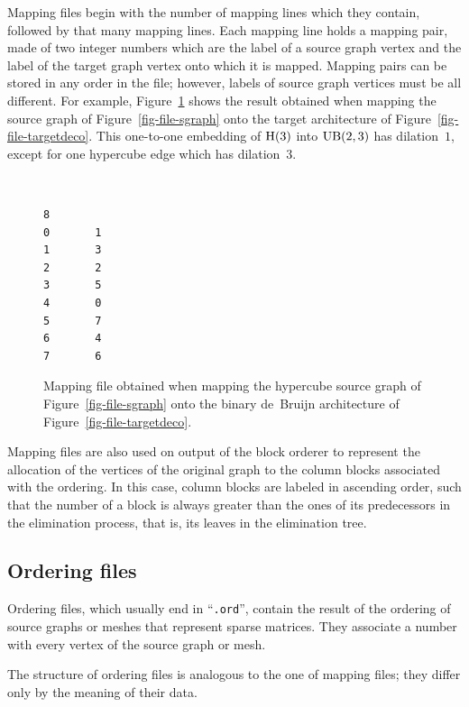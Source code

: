 Mapping files begin with the number of mapping lines which they contain,
followed by that many mapping lines.
Each mapping line holds a mapping pair, made of two integer numbers
which are the label of a source graph vertex and the label
of the target graph vertex onto which it is mapped.
Mapping pairs can be stored in any order in the file; however, labels of
source graph vertices must be all different.
For example, Figure~\ref{fig-file-mapping} shows the result obtained when
mapping the source graph of Figure~\ref{fig-file-sgraph} onto the target
architecture of Figure~\ref{fig-file-targetdeco}.
This one-to-one embedding of ${\rm H}(3)$ into ${\rm UB}(2,3)$ has dilation~$1$,
except for one hypercube edge which has dilation~$3$.
\begin{figure}[hbt]
\begin{center}
\begin{minipage}{3cm}
{\renewcommand{\baselinestretch}{1.05}
\footnotesize\tt
\begin{verbatim}
8
0       1
1       3
2       2
3       5
4       0
5       7
6       4
7       6
\end{verbatim}
}\end{minipage}
\end{center}
\caption{Mapping file obtained when mapping the hypercube source graph of
         Figure~\protect\ref{fig-file-sgraph} onto the binary de~Bruijn
         architecture of Figure~\protect\ref{fig-file-targetdeco}.}
\label{fig-file-mapping}
\end{figure}

Mapping files are also used on output of the block orderer to
represent the allocation of the vertices of the original graph to the
column blocks associated with the ordering. In this case, column blocks
are labeled in ascending order, such that the number of a block is
always greater than the ones of its predecessors in the elimination
process, that is, its leaves in the elimination tree.

\subsection{Ordering files}
\label{sec-file-ord}

Ordering files, which usually end in ``\texttt{\@.ord}'', contain the
result of the ordering of source graphs or meshes that represent
sparse matrices. They associate a number with every vertex of the
source graph or mesh.

The structure of ordering files is analogous to the one of mapping
files; they differ only by the meaning of their data.

